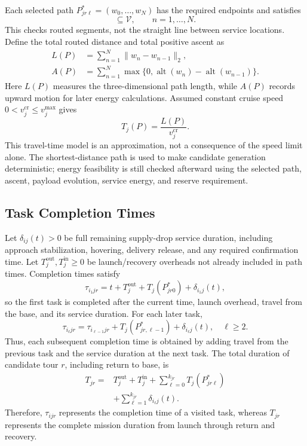 \documentclass[conference]{IEEEtran}
\begin{document}
Each selected path $P^*_{jr\ell}=(w_0,\ldots,w_N)$ has the required endpoints and satisfies
\begin{equation}
[w_{n-1},w_n]\subseteq\mathcal V,\qquad n=1,\ldots,N.
\end{equation}
This checks routed segments, not the straight line between service locations. Define the total routed distance and total positive ascent as
\begin{align}
L(P)&=\sum_{n=1}^{N}\|w_n-w_{n-1}\|_2,\\
A(P)&=\sum_{n=1}^{N}
\max\{0,\operatorname{alt}(w_n)-\operatorname{alt}(w_{n-1})\}.
\end{align}
Here $L(P)$ measures the three-dimensional path length, while $A(P)$ records upward motion for later energy calculations. Assumed constant cruise speed $0<v_j^{\mathrm{cr}}\leq v_j^{\max}$ gives
\begin{equation}
T_j(P)=\frac{L(P)}{v_j^{\mathrm{cr}}}.
\end{equation}
This travel-time model is an approximation, not a consequence of the speed limit alone. The shortest-distance path is used to make candidate generation deterministic; energy feasibility is still checked afterward using the selected path, ascent, payload evolution, service energy, and reserve requirement.

\subsection{Task Completion Times}
Let $\delta_{ij}(t)>0$ be full remaining supply-drop service duration, including approach stabilization, hovering, delivery release, and any required confirmation time. Let $T_j^{\mathrm{out}},T_j^{\mathrm{in}}\geq0$ be launch/recovery overheads not already included in path times. Completion times satisfy
\begin{equation}
\tau_{i_1jr}=t+T_j^{\mathrm{out}}+T_j(P^*_{jr0})+\delta_{i_1j}(t),
\end{equation}
so the first task is completed after the current time, launch overhead, travel from the base, and its service duration. For each later task,
\begin{equation}
\tau_{i_\ell jr}=\tau_{i_{\ell-1}jr}+T_j(P^*_{jr,\ell-1})+\delta_{i_\ell j}(t),
\quad \ell\geq2.
\end{equation}
Thus, each subsequent completion time is obtained by adding travel from the previous task and the service duration at the next task. The total duration of candidate tour $r$, including return to base, is
\begin{equation}
\begin{split}
T_{jr}={}&T_j^{\mathrm{out}}+T_j^{\mathrm{in}}
+\sum_{\ell=0}^{k_{jr}}T_j(P^*_{jr\ell})\\
&+\sum_{\ell=1}^{k_{jr}}\delta_{i_\ell j}(t).
\end{split}
\end{equation}
Therefore, $\tau_{ijr}$ represents the completion time of a visited task, whereas $T_{jr}$ represents the complete mission duration from launch through return and recovery.
\end{document}
